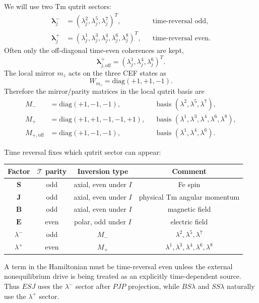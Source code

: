 \documentclass[11pt,a4paper]{article}
\newcommand{\diag}{\mathrm{diag}}
\newcommand{\ve}[1]{\boldsymbol{#1}}
\newcommand{\lvecminus}{\boldsymbol{\lambda}^{-}}
\newcommand{\lvecplus}{\boldsymbol{\lambda}^{+}}
\begin{document}
We will use two Tm qutrit sectors:
\begin{align}
  \lvecminus_j &= (\lambda_j^2,\lambda_j^5,\lambda_j^7)^T,
  &&\text{time-reversal odd},\\
  \lvecplus_j &= (\lambda_j^1,\lambda_j^3,\lambda_j^4,\lambda_j^6,\lambda_j^8)^T,
  &&\text{time-reversal even}.
\end{align}
Often only the off-diagonal time-even coherences are kept,
\begin{equation}
  \lvecplus_{j,\mathrm{off}}=(\lambda_j^1,\lambda_j^4,\lambda_j^6)^T.
\end{equation}
The local mirror $m_z$ acts on the three CEF states as
\begin{equation}
  W_{m_z}=\diag(+1,+1,-1).
\end{equation}
Therefore the mirror/parity matrices in the local qutrit basis are
\begin{align}
  M_- &= \diag(+1,-1,-1),
  &&\text{basis }(\lambda^2,\lambda^5,\lambda^7),\\
  M_+ &= \diag(+1,+1,-1,-1,+1),
  &&\text{basis }(\lambda^1,\lambda^3,\lambda^4,\lambda^6,\lambda^8),\\
  M_{+,\mathrm{off}} &= \diag(+1,-1,-1),
  &&\text{basis }(\lambda^1,\lambda^4,\lambda^6).
\end{align}

\begin{keybox}
Time reversal fixes which qutrit sector can appear:
\begin{center}
\renewcommand{\arraystretch}{1.2}
\begin{tabular}{c c c c}
\toprule
Factor & $\mathcal T$ parity & Inversion type & Comment\\
\midrule
$\ve S$ & odd & axial, even under $I$ & Fe spin\\
$\ve J$ & odd & axial, even under $I$ & physical Tm angular momentum\\
$\ve B$ & odd & axial, even under $I$ & magnetic field\\
$\ve E$ & even & polar, odd under $I$ & electric field\\
$\lambda^-$ & odd & $M_-$ & $\lambda^2,\lambda^5,\lambda^7$\\
$\lambda^+$ & even & $M_+$ & $\lambda^1,\lambda^3,\lambda^4,\lambda^6,\lambda^8$\\
\bottomrule
\end{tabular}
\end{center}
A term in the Hamiltonian must be time-reversal even unless the external nonequilibrium drive is being treated as an explicitly time-dependent source.  Thus $E S J$ uses the $\lambda^-$ sector after $PJP$ projection, while $B S\lambda$ and $S S\lambda$ naturally use the $\lambda^+$ sector.
\end{keybox}
\end{document}
